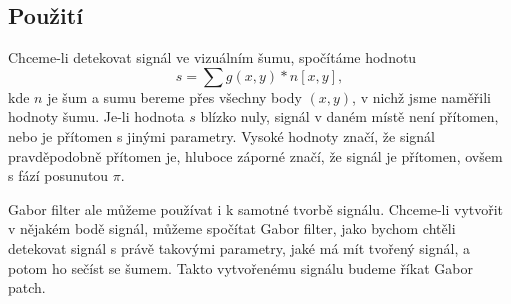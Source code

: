 \subsection{Použití}

Chceme-li detekovat signál ve vizuálním šumu, spočítáme hodnotu $$s=\sum
g(x,y)*n[x,y],$$ kde $n$ je šum a sumu bereme přes všechny body $(x,y)$, v
nichž jsme naměřili hodnoty šumu. Je-li hodnota $s$  blízko nuly, signál v
daném místě není přítomen, nebo je přítomen s jinými parametry. Vysoké hodnoty
značí, že
signál pravděpodobně přítomen je, hluboce záporné značí, že signál je přítomen,
ovšem s fází posunutou $\pi$.

Gabor filter ale můžeme používat i k samotné tvorbě signálu. Chceme-li vytvořit
v nějakém bodě signál, můžeme spočítat Gabor filter, jako bychom chtěli
detekovat signál s právě takovými parametry, jaké má mít tvořený signál, a
potom ho sečíst se šumem. Takto vytvořenému signálu budeme říkat Gabor patch.

